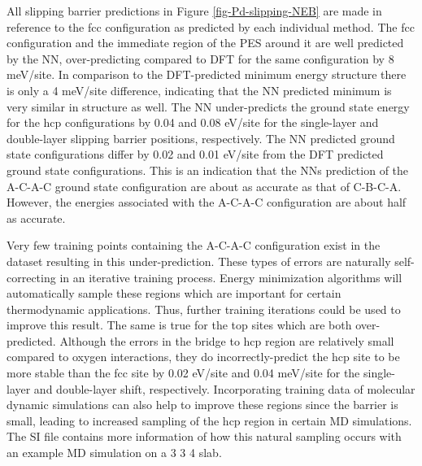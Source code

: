 \documentclass[12pt]{cmuthesis}
\begin{document}
All slipping barrier predictions in Figure \ref{fig-Pd-slipping-NEB} are made in reference to the fcc configuration as predicted by each individual method. The fcc configuration and the immediate region of the PES around it are well predicted by the NN, over-predicting compared to DFT for the same configuration by 8 meV/site. In comparison to the DFT-predicted minimum energy structure there is only a 4 meV/site difference, indicating that the NN predicted minimum is very similar in structure as well. The NN under-predicts the ground state energy for the hcp configurations by 0.04 and 0.08 eV/site for the single-layer and double-layer slipping barrier positions, respectively. The NN predicted ground state configurations differ by 0.02 and 0.01 eV/site from the DFT predicted ground state configurations. This is an indication that the NNs prediction of the A-C-A-C ground state configuration are about as accurate as that of C-B-C-A. However, the energies associated with the A-C-A-C configuration are about half as accurate.

Very few training points containing the A-C-A-C configuration exist in the dataset resulting in this under-prediction. These types of errors are naturally self-correcting in an iterative training process. Energy minimization algorithms will automatically sample these regions which are important for certain thermodynamic applications. Thus, further training iterations could be used to improve this result. The same is true for the top sites which are both over-predicted. Although the errors in the bridge to hcp region are relatively small compared to oxygen interactions, they do incorrectly-predict the hcp site to be more stable than the fcc site by 0.02 eV/site and 0.04 meV/site for the single-layer and double-layer shift, respectively. Incorporating training data of molecular dynamic simulations can also help to improve these regions since the barrier is small, leading to increased sampling of the hcp region in certain MD simulations. The SI file contains more information of how this natural sampling occurs with an example MD simulation on a 3 \texttimes{} 3 \texttimes{} 4 slab.
\end{document}

